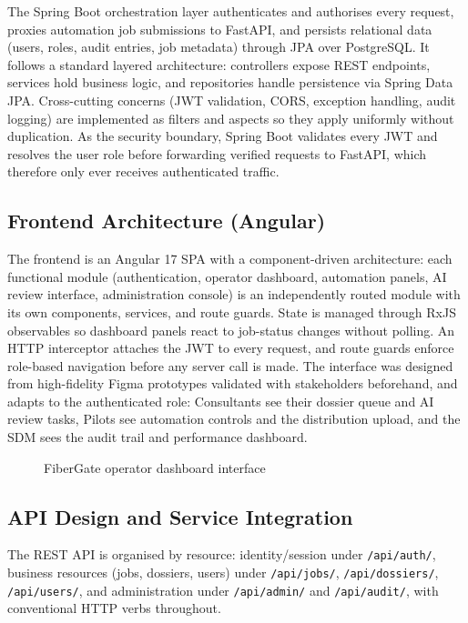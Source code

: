 The Spring Boot orchestration layer authenticates and authorises every request, proxies automation job submissions to FastAPI, and persists relational data (users, roles, audit entries, job metadata) through JPA over PostgreSQL. It follows a standard layered architecture: controllers expose REST endpoints, services hold business logic, and repositories handle persistence via Spring Data JPA. Cross-cutting concerns (JWT validation, CORS, exception handling, audit logging) are implemented as filters and aspects so they apply uniformly without duplication. As the security boundary, Spring Boot validates every JWT and resolves the user role before forwarding verified requests to FastAPI, which therefore only ever receives authenticated traffic.

\subsection{Frontend Architecture (Angular)}

The frontend is an Angular 17 SPA with a component-driven architecture: each functional module (authentication, operator dashboard, automation panels, AI review interface, administration console) is an independently routed module with its own components, services, and route guards. State is managed through RxJS observables so dashboard panels react to job-status changes without polling. An HTTP interceptor attaches the JWT to every request, and route guards enforce role-based navigation before any server call is made. The interface was designed from high-fidelity Figma prototypes validated with stakeholders beforehand, and adapts to the authenticated role: Consultants see their dossier queue and AI review tasks, Pilots see automation controls and the distribution upload, and the SDM sees the audit trail and performance dashboard.

\begin{figure}[H]
  \centering
  \caption{FiberGate operator dashboard interface}
  \label{fig:dashboard-screenshot}
\end{figure}

\subsection{API Design and Service Integration}

The REST API is organised by resource: identity/session under \texttt{/api/auth/}, business resources (jobs, dossiers, users) under \texttt{/api/jobs/}, \texttt{/api/dossiers/}, \texttt{/api/users/}, and administration under \texttt{/api/admin/} and \texttt{/api/audit/}, with conventional HTTP verbs throughout.

